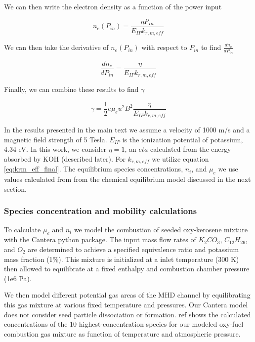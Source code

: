 We can then write the electron density as a function of the power input

\begin{equation}
n_{e}(P_{in}) = \frac{\eta P_{In}}{E_{IP}k_{r, m, eff}}
\end{equation}

We can then take the derivative of $n_{e}(P_{in})$ with respect to $P_{in}$ to find $\frac{dn_{e}}{dP_{in}}$

\begin{equation}
\frac{dn_{e}}{dP_{in}} = \frac{\eta}{E_{IP}k_{r, m, eff}}
\end{equation}

Finally, we can combine these results to find $\gamma$

\begin{equation}
\gamma = \frac{1}{2} e \mu_e u^2 B^2 \frac{\eta}{E_{IP}k_{r, m, eff}}
\end{equation}

In the results presented in the main text we assume a velocity of 1000 m/s and a magnetic field strength of 5 Tesla. $E_{IP}$ is the ionization potential of potassium, 4.34 eV. In this work, we consider $\eta =1$, an $eta$ calculated from the energy absorbed by KOH (described later). For $k_{r, m, eff}$ we utilize equation \ref{eq:krm_eff_final}. The equilibrium species concentrations, $n_i$, and $\mu_e$ we use values calculated from from the chemical equilibrium model discussed in the next section. 




\subsubsection{Species concentration and mobility calculations}

To calculate $\mu_e$ and $n_i$ we model the combustion of seeded oxy-kerosene mixture with the Cantera python package. The input mass flow rates of $K_2CO_3$, $C_{12}H_{26}$, and $O_2$ are determined to achieve a specified equivalence ratio and potassium mass fraction (1\%). This mixture is initialized at a inlet temperature (300 K) then allowed to equilibrate at a fixed enthalpy and combustion chamber pressure (1e6 Pa).

We then model different potential gas areas of the MHD channel by equilibrating this gas mixture at various fixed temperature and pressures. Our Cantera model does not consider seed particle dissociation or formation. ref shows the calculated concentrations of the 10 highest-concentration species for our modeled oxy-fuel combustion gas mixture as function of temperature and atmospheric pressure.

